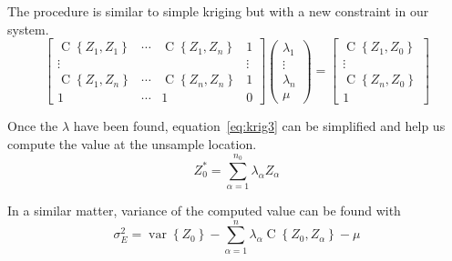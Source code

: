 \documentclass[twocolumn]{article}
\numberwithin{equation}{section}
\begin{document}
The procedure is similar to simple kriging but with a new constraint in our system.
\[
		\begin{bmatrix}
       		\operatorname{C}\left\{Z_1,Z_1\right\} 	& \cdots 	& \operatorname{C}\left\{Z_1,Z_n\right\} & 1  		\\
       		\vdots 									& 			& 										& \vdots 	\\
       		\operatorname{C}\left\{Z_1,Z_n\right\}  	& \cdots 	& \operatorname{C}\left\{Z_n,Z_n\right\}	& 1			\\
       		1										& \cdots	 	& 1										& 0
     	\end{bmatrix}
     	\begin{pmatrix}
       		\lambda_1 	\\
       		\vdots 		\\
       		\lambda_n	\\
       		\mu  
     	\end{pmatrix}
     	=
     	\begin{bmatrix}
       		\operatorname{C}\left\{Z_1,Z_0\right\} 	\\
       		\vdots 									\\
       		\operatorname{C}\left\{Z_n,Z_0\right\} 	\\
       		1
     	\end{bmatrix}
\] 

Once the $\lambda$ have been found, equation~\ref{eq:krig3} can be simplified and help us compute the value at the unsample location.
\begin{equation}
	Z_0^* =  \sum_{\alpha=1}^{n_0}\lambda_\alpha Z_\alpha
\end{equation}

In a similar matter, variance of the computed value can be found with
\begin{equation}
	\sigma^2_E  = \operatorname{var}\left\{Z_0\right\} - \sum_{\alpha=1}^n \lambda_\alpha \operatorname{C}\left\{Z_0, Z_\alpha\right\} -\mu
\end{equation}
\end{document}
